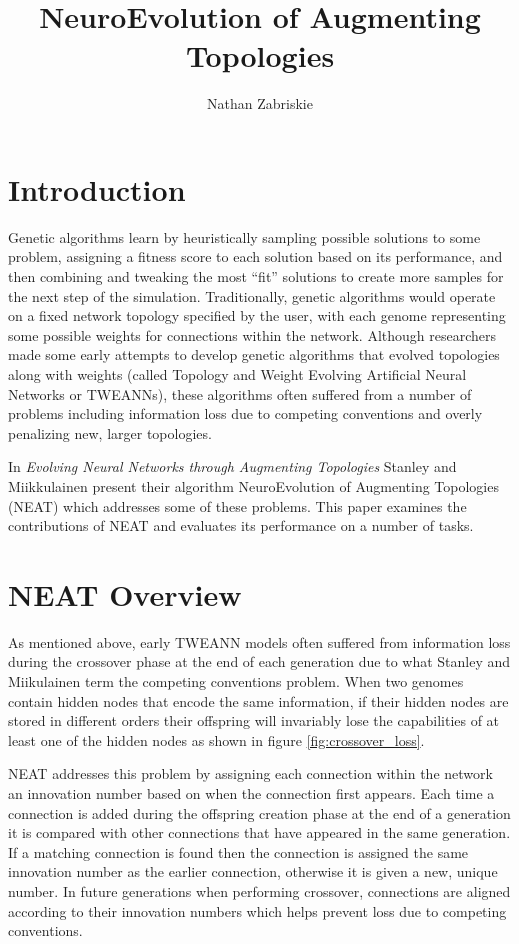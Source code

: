 \documentclass[letterpaper]{article}
\title{NeuroEvolution of Augmenting Topologies}
\author{Nathan Zabriskie}
\begin{document}
\maketitle

\section{Introduction} \label{sec:intro} 
Genetic algorithms learn by heuristically sampling possible solutions to some problem, assigning a fitness
score to each solution based on its performance, and then combining and tweaking the most 
``fit'' solutions to create more samples for the next step of the simulation. Traditionally, 
genetic algorithms would operate on a fixed network topology specified by the user, with each 
genome representing some possible weights for connections within the network. Although
researchers made some early attempts to develop genetic algorithms that evolved topologies along with 
weights (called Topology and Weight Evolving Artificial Neural Networks or TWEANNs), 
these algorithms often suffered from a number of problems including information loss due to competing 
conventions and overly penalizing new, larger topologies. 

In \textit{Evolving Neural Networks through Augmenting Topologies} \cite{neat_paper} Stanley and 
Miikkulainen present their algorithm NeuroEvolution of Augmenting Topologies (NEAT) which addresses some of
these problems. This paper examines the contributions of NEAT and evaluates its performance on a number
of tasks.

\section{NEAT Overview} \label{sec:overview}
As mentioned above, early TWEANN models often suffered from information loss during the crossover phase
at the end of each generation due to what Stanley and Miikulainen term the competing conventions problem.
When two genomes contain hidden nodes that encode the same information, if their hidden nodes are stored 
in different orders their offspring will invariably lose the capabilities of at least one of the 
hidden nodes as shown in figure \ref{fig:crossover_loss}. 

NEAT addresses this problem by assigning each connection within the network an innovation number based on
when the connection first appears. Each time a connection is added during the offspring creation phase at the end of a generation it is compared with other connections that have appeared in the same generation. 
If a matching connection is found then the connection is assigned the same innovation number as the earlier
connection, otherwise it is given a new, unique number. In future generations when performing crossover,
connections are aligned according to their innovation numbers which helps prevent loss due to competing
conventions. 
\end{document}
